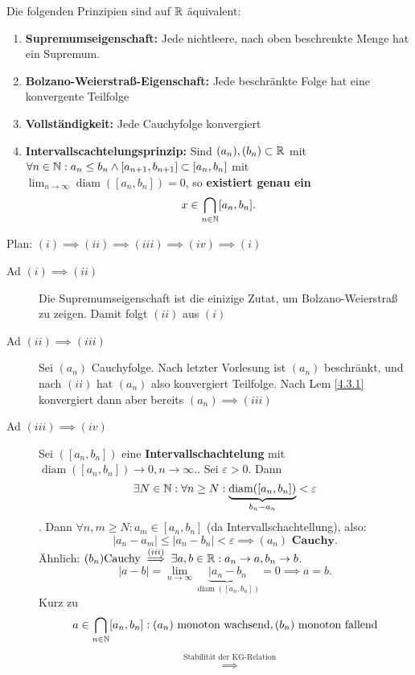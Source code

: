 \documentclass[consecutivenumbering]{gadsescript}
\begin{document}
\begin{subtheorem}
	Die folgenden Prinzipien sind auf $ \mathbb{R} $ äquivalent:
	\begin{enumerate}[label=(\roman*)]
		\item \textbf{Supremumseigenschaft:} Jede nichtleere, nach oben beschrenkte Menge hat ein Supremum.
		\item \textbf{Bolzano-Weierstraß-Eigenschaft:} Jede beschränkte Folge hat eine konvergente Teilfolge
		\item \textbf{Vollständigkeit:} Jede Cauchyfolge konvergiert
		\item \textbf{Intervallscachtelungsprinzip:} Sind $ (a_n), (b_n) \subset \mathbb{R} $ mit $ \forall n \in \mathbb{N} : a_n \leq b_n \wedge [a_{n+1}, b_{n+1}] \subset [a_n, b_n] $ mit
			$\lim_{n\to\infty} \operatorname{diam}([a_n, b_n]) = 0 $, so \textbf{existiert genau ein}
			\[ x \in \bigcap_{n\in\mathbb{N}}[a_n, b_n]. \]
	\end{enumerate}
	\begin{subproof*}
		Plan: $ (i) \implies (ii) \implies (iii) \implies (iv) \implies (i) $
		\begin{description}
			\item[Ad $ (i) \implies (ii) $] Die Supremumseigenschaft ist die einizige Zutat, um Bolzano-Wei\-er\-straß zu zeigen. Damit folgt $(ii)$ aus $(i)$
			\item[Ad $ (ii) \implies (iii) $] Sei $ (a_n) $ Cauchyfolge. Nach letzter Vorlesung ist $ ( a_n ) $ beschränkt, und nach $ (ii) $ hat $ (a_n ) $ also konvergiert Teilfolge. Nach Lem \ref{4.3.1} konvergiert dann aber bereits $ (a_n) \implies (iii) $
			\item[Ad $ (iii) \implies (iv)$] Sei $ ([a_n, b_n]) $ eine \textbf{Intervallschachtelung} mit $ \operatorname{diam}([a_n, b_n]) \to 0, n \to \infty. $. Sei $ \varepsilon > 0 $.
				Dann \[ \exists N \in \mathbb{N} : \forall n \geq N : \underbrace{\operatorname{diam}([a_n, b_n])}_{b_n - a_n} < \varepsilon \].
				Dann $ \forall n, m \geq N : a_m \in [a_n, b_n] $ (da Intervallschachtellung), also:
				\[ | a_n - a_m | \leq | a_n - b_n| < \varepsilon \implies (a_n) \textbf{ Cauchy}.\]
				Ähnlich: $ (b_n) \text{Cauchy} \overset{(iii)}{\implies} \exists a, b \in \mathbb{R}: a_n \to a, b_n \to b $.
				\[ | a- b| = \lim_{n\to\infty} \underbrace{|a_n -b_n}_{\operatorname{diam}([a_n, b_n])} = 0 \implies a = b. \]
				Kurz zu
				\[ a \in \bigcap_{n\in\mathbb{N}}[a_n, b_n] : (a_n) \text{ monoton wachsend}, (b_n) \text{ monoton fallend} \]
				\begin{align*}
					&\overset{\text{Stabilität der KG-Relation}}{\implies}

\end{align*}
\end{description}
\end{subproof*}
\end{subtheorem}
\end{document}
